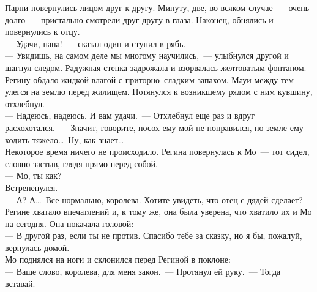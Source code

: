 Парни повернулись лицом друг к другу. Минуту, две, во всяком случае~--- очень 
долго~--- пристально смотрели друг другу в глаза. Наконец, обнялись и 
повернулись к отцу.\\
--- Удачи, папа!~--- сказал один и ступил в рябь.\\
--- Увидишь, на самом деле мы многому научились,~--- улыбнулся другой и шагнул 
следом. Радужная стенка задрожала и взорвалась желтоватым фонтаном. Регину 
обдало жидкой влагой с приторно--сладким запахом. Мауи между тем улегся на землю 
перед жилищем. Потянулся к возникшему рядом с ним кувшину, отхлебнул.\\
--- Надеюсь, надеюсь. И вам удачи.~--- Отхлебнул еще раз и вдруг 
расхохотался.~--- Значит, говорите, посох ему мой не понравился, по земле ему ходить 
тяжело\ldots\ Ну, как знает\ldots\\
Некоторое время ничего не происходило. Регина повернулась к Мо~--- тот сидел, 
словно застыв, глядя прямо перед собой. \\
--- Мо, ты как?\\
Встрепенулся. \\
--- А? А\ldots\ Все нормально, королева. Хотите увидеть, что отец с дядей сделает?\\
Регине хватало впечатлений и, к тому же, она была уверена, что хватило их и Мо 
на сегодня. Она покачала головой:\\
--- В другой раз, если ты не против. Спасибо тебе за сказку, но я бы, пожалуй, 
вернулась домой.\\
Мо поднялся на ноги и склонился перед Региной в поклоне:\\
--- Ваше слово, королева, для меня закон.~--- Протянул ей руку.~--- Тогда вставай.


